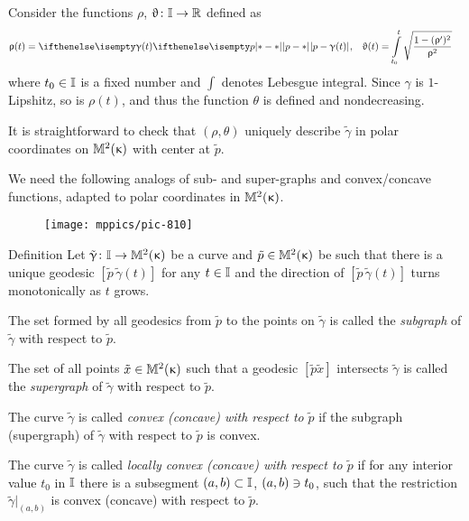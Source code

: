 Consider the functions $\rho$, $\theta\:\II\to\RR$ defined as 
\begin{align*}
\rho(t)
&=\dist{p}{\gamma(t)}{},
&
\theta(t)
&=
\int\limits_{t_0}^{t}\sqrt{\frac{1-(\rho')^2}{\rho^2}}
\end{align*}
where $t_0\in\II$ is a fixed number and $\int$  denotes Lebesgue integral.
Since $\gamma$ is $1$-Lipshitz, so is $\rho(t)$, and thus the function $\theta$ is defined and nondecreasing.

It is straightforward to check that $(\rho,\theta)$ uniquely describe $\tilde \gamma$ in polar coordinates on $\mathbb{M}_{{}}^{2}({\upkappa})$ with center at $\tilde p$.
\qeds
                                                                                                                                                                                                                                                                                                                                                                        
We need the following analogs of sub- and super-graphs %
 and convex/concave functions, adapted to polar coordinates in $\mathbb{M}_{{}}^{2}({\upkappa})$.

\begin{wrapfigure}{o}{38 mm}
\vskip-0mm
\centering
\texttt{[image: mppics/pic-810]}
\end{wrapfigure}

\begin{thm}{Definition}\label{def:convex-devel}
Let $\tilde \gamma\:\II\to\Lob2\kappa$ be a curve and $\tilde p\in\Lob2\kappa$ be such that there is a unique geodesic $[\tilde p\,\tilde \gamma(t)]$ for any $t\in\II$ and the direction of $[\tilde p\,\tilde \gamma(t)]$ turns monotonically as $t$ grows.

The set formed by all geodesics from  $\tilde p$ to the points on $\tilde \gamma$ is called the  \emph{subgraph} of $\tilde \gamma$ with respect to $\tilde p$.

The set of all points $\tilde x\in\Lob2{\kappa}$ such that a geodesic $[\tilde p\tilde x]$ intersects $\tilde \gamma$ is called the \emph{supergraph} of $\tilde \gamma$ with respect to $\tilde p$.

The curve $\tilde \gamma$ is called \emph{convex (concave) with respect to} $\tilde p$ if the subgraph (supergraph) of $\tilde \gamma$ with respect to $\tilde p$ is convex.

The curve $\tilde \gamma$ is called 
\emph{locally convex (concave) with respect to $\tilde p$} 
if for any interior value $t_0$ in $\mathbb{I}$ there is a subsegment $(a,b)\subset\II$, $(a,b)\z\ni t_0$, such that the restriction $\tilde \gamma|_{(a,b)}$ is convex (concave) with respect to $\tilde p$.
\end{thm}

